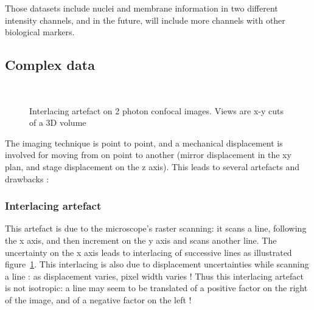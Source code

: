 Those datasets include nuclei and membrane information in two different intensity channels, and in the future, will include more channels with other biological markers. 


\subsection{Complex data}
\begin{figure}[htb]
  \centering
  \\
  \caption{Interlacing artefact on 2 photon confocal images. Views are x-y cuts of a 3D volume}
  \label{fig:InterlacingArtefact}
\end{figure}
The imaging technique is point to point, and a mechanical displacement is involved for moving from on point to another (mirror displacement in the xy plan, and stage displacement on the z axis). This leads to several artefacts and drawbacks :



\subsubsection{Interlacing artefact}
This artefact is due to the microscope's raster scanning: it scans a line, following the x axis, and then increment on the y axis and scans another line.
The uncertainty on the x axis leads to interlacing of successive lines as illustrated figure~\ref{fig:InterlacingArtefact}.
This interlacing is also due to displacement uncertainties while scanning a line : as displacement varies, pixel width varies !
Thus this interlacing artefact is not isotropic: a line may seem to be translated of a positive factor on the right of the image, and of a negative factor on the left !


